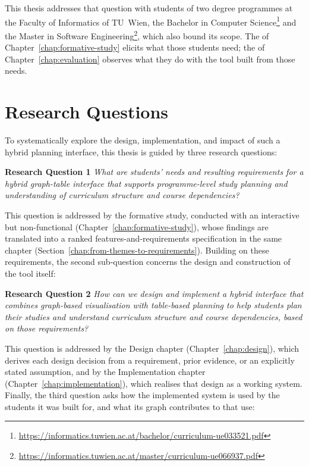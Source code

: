 This thesis addresses that question with students of two degree programmes at the
Faculty of Informatics of TU~Wien, the Bachelor in Computer
Science\footnote{\url{https://informatics.tuwien.ac.at/bachelor/curriculum-ue033521.pdf}}
and the Master in Software
Engineering\footnote{\url{https://informatics.tuwien.ac.at/master/curriculum-ue066937.pdf}},
which also bound its scope. The  of
Chapter~\ref{chap:formative-study} elicits what those students need; the
 of Chapter~\ref{chap:evaluation} observes what they do with the
tool built from those needs.

\section{Research Questions}
\label{sec:research-questions}
To systematically explore the design, implementation, and impact of such a hybrid planning interface, this thesis is guided by three research questions:

\textbf{Research Question 1} \emph{What are students' needs and resulting requirements for a hybrid graph-table interface that supports programme-level study planning and understanding of curriculum structure and course dependencies?}

This question is addressed by the formative study, conducted with an interactive but non-functional  (Chapter~\ref{chap:formative-study}), whose findings are translated into a ranked features-and-requirements specification in the same chapter (Section~\ref{chap:from-themes-to-requirements}).
Building on these requirements, the second sub-question concerns the design and construction of the tool itself:

\textbf{Research Question 2} \emph{How can we design and implement a hybrid interface that combines graph-based visualisation with table-based planning to help students plan their studies and understand curriculum structure and course dependencies, based on those requirements?}

This question is addressed by the Design chapter (Chapter~\ref{chap:design}), which derives each design decision from a requirement, prior evidence, or an explicitly stated assumption, and by the Implementation chapter (Chapter~\ref{chap:implementation}), which realises that design as a working system.
Finally, the third question asks how the implemented system is used by the students it was built for, and what its graph contributes to that use:

